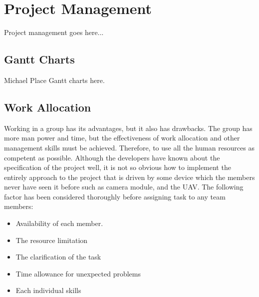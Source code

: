 \chapter{Project Management}
Project management goes here...

\section{Gantt Charts}
Michael
Place Gantt charts here.



\section{Work Allocation}

Working in a group has its advantages, but it also has drawbacks. The group has more man power and time, but the effectiveness of work allocation and other management skills must be achieved. Therefore, to use all the human resources as competent as possible. Although the developers have known about the specification of the project well, it is not so obvious how to implement the entirely approach to the project that is driven by some device which the members never have seen it before such as camera module, and the UAV. The following factor has been considered thoroughly before assigning task to any team members:

\begin{itemize}
\item	Availability of each member.

\item	The resource limitation
 
\item	The clarification of the task

\item   Time allowance for unexpected problems

\item	Each individual skills
\end{itemize}

